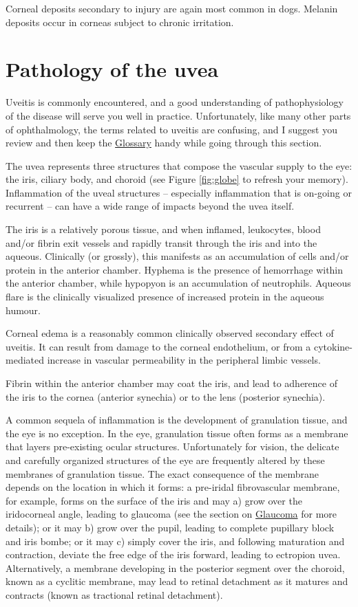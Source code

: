 \documentclass[openany]{article}
\begin{document}
Corneal deposits secondary to injury are again most common in dogs.
Melanin deposits occur in corneas subject to chronic irritation.

\section{Pathology of the uvea}\label{pathology-of-the-uvea}

Uveitis is commonly encountered, and a good understanding of
pathophysiology of the disease will serve you well in practice.
Unfortunately, like many other parts of ophthalmology, the terms related
to uveitis are confusing, and I suggest you review and then keep the
\protect\hyperlink{glossary}{Glossary} handy while going through this
section.

The uvea represents three structures that compose the vascular supply to
the eye: the iris, ciliary body, and choroid (see Figure \ref{fig:globe}
to refresh your memory). Inflammation of the uveal structures --
especially inflammation that is on-going or recurrent -- can have a wide
range of impacts beyond the uvea itself.

The iris is a relatively porous tissue, and when inflamed, leukocytes,
blood and/or fibrin exit vessels and rapidly transit through the iris
and into the aqueous. Clinically (or grossly), this manifests as an
accumulation of cells and/or protein in the anterior chamber. Hyphema is
the presence of hemorrhage within the anterior chamber, while hypopyon
is an accumulation of neutrophils. Aqueous flare is the clinically
visualized presence of increased protein in the aqueous humour.

Corneal edema is a reasonably common clinically observed secondary
effect of uveitis. It can result from damage to the corneal endothelium,
or from a cytokine-mediated increase in vascular permeability in the
peripheral limbic vessels.

Fibrin within the anterior chamber may coat the iris, and lead to
adherence of the iris to the cornea (anterior synechia) or to the lens
(posterior synechia).

A common sequela of inflammation is the development of granulation
tissue, and the eye is no exception. In the eye, granulation tissue
often forms as a membrane that layers pre-existing ocular structures.
Unfortunately for vision, the delicate and carefully organized
structures of the eye are frequently altered by these membranes of
granulation tissue. The exact consequence of the membrane depends on the
location in which it forms: a pre-iridal fibrovascular membrane, for
example, forms on the surface of the iris and may a) grow over the
iridocorneal angle, leading to glaucoma (see the section on
\protect\hyperlink{glaucoma}{Glaucoma} for more details); or it may b)
grow over the pupil, leading to complete pupillary block and iris bombe;
or it may c) simply cover the iris, and following maturation and
contraction, deviate the free edge of the iris forward, leading to
ectropion uvea. Alternatively, a membrane developing in the posterior
segment over the choroid, known as a cyclitic membrane, may lead to
retinal detachment as it matures and contracts (known as tractional
retinal detachment).
\end{document}
